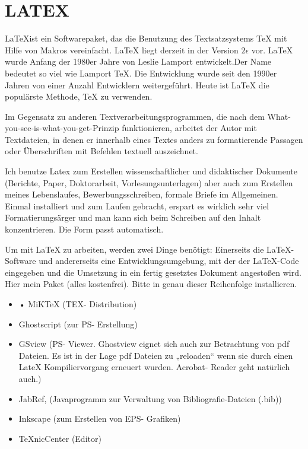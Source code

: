 \section{LATEX}

\LaTeX ist ein Softwarepaket, das die Benutzung des Textsatzsystems TeX mit Hilfe von Makros vereinfacht. LaTeX liegt derzeit in der Version $2\epsilon$ vor. LaTeX wurde Anfang der 1980er Jahre von Leslie Lamport entwickelt.Der Name bedeutet so viel wie Lamport TeX. Die Entwicklung wurde seit den 1990er Jahren von einer Anzahl Entwicklern weitergeführt. Heute ist LaTeX die populärste Methode, TeX zu verwenden. 
\cite{wikilatex}

Im Gegensatz zu anderen Textverarbeitungsprogrammen, die nach dem What-you-see-is-what-you-get-Prinzip funktionieren, arbeitet der Autor mit Textdateien, in denen er innerhalb eines Textes anders zu formatierende Passagen oder Überschriften mit Befehlen textuell auszeichnet. 
\cite{wikilatex}

Ich benutze Latex zum Erstellen wissenschaftlicher und didaktischer Dokumente (Berichte, Paper, Doktorarbeit, Vorlesungsunterlagen) aber auch zum Erstellen meines Lebenslaufes, Bewerbungsschreiben, formale Briefe im Allgemeinen. Einmal installiert und zum Laufen gebracht, erspart es wirklich sehr viel Formatierungsärger und man kann sich beim Schreiben auf den Inhalt konzentrieren. Die Form passt automatisch.

Um mit LaTeX zu arbeiten, werden zwei Dinge benötigt: Einerseits die LaTeX-Software und andererseits eine Entwicklungsumgebung, mit der der LaTeX-Code eingegeben und die Umsetzung in ein fertig gesetztes Dokument angestoßen wird. Hier mein Paket (alles kostenfrei). Bitte in genau dieser Reihenfolge installieren.

\begin{itemize}
    \item • MiKTeX (TEX- Distribution)
\item Ghostscript (zur PS- Erstellung)
\item GSview (PS- Viewer. Ghostview eignet sich auch zur Betrachtung von pdf Dateien. Es ist in der Lage pdf Dateien zu „reloaden“ wenn sie durch einen LateX Kompiliervorgang erneuert wurden. Acrobat- Reader geht natürlich auch.)
\item JabRef, (Javaprogramm zur Verwaltung von Bibliografie-Dateien (.bib))
\item Inkscape (zum Erstellen von EPS- Grafiken)
\item TeXnicCenter (Editor)
\end{itemize}


